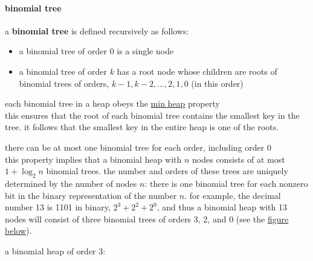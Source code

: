 \documentclass[a4paper,12pt]{article}
\begin{document}
\paragraph{binomial tree}
\label{sec:org6e9f2b7}
\begin{definition}
a \textbf{binomial tree} is defined recursively as follows:\\[0pt]
\begin{itemize}
\item a binomial tree of order 0 is a single node\\[0pt]
\item a binomial tree of order \(k\) has a root node whose children are roots of binomial trees of orders, \(k-1,k-2,\ldots,2,1,0\) (in this order)\\[0pt]
\end{itemize}

\begin{characteristic}
each binomial tree in a heap obeys the \hyperref[sec:orgc87ebb0]{min heap} property\\[0pt]
this ensures that the root of each binomial tree contains the smallest key in the tree. it follows that the smallest key in the entire heap is one of the roots.\\[0pt]
\end{characteristic}

\begin{characteristic}
there can be at most one binomial tree for each order, including order 0\\[0pt]
this property implies that a binomial heap with \(n\) nodes consists of at most \(1+\log_2n\) binomial trees. the number and orders of these trees are uniquely determined by the number of nodes \(n\): there is one binomial tree for each nonzero bit in the binary representation of the number \(n\). for example, the decimal number 13 is 1101 in binary, \(2^3+2^2+2^0\), and thus a binomial heap with 13 nodes will consist of three binomial trees of orders 3, 2, and 0 (see the \hyperref[orgd409229]{figure below}).\\[0pt]
\end{characteristic}

\begin{my_example}
a binomial heap of order 3:\\[0pt]

\begin{center}

\end{center}\\[0pt]
\end{my_example}


\end{definition}
\end{document}
